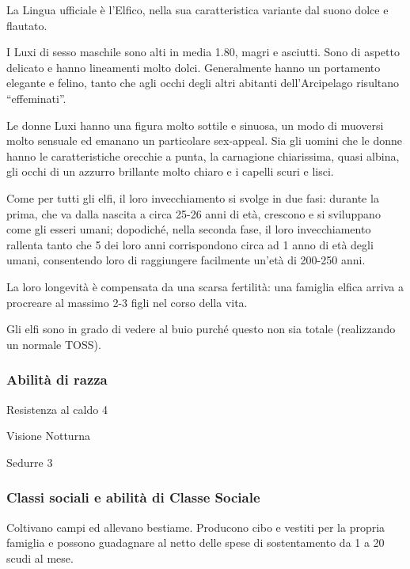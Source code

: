 La Lingua ufficiale \`e l'Elfico, nella sua caratteristica variante
dal suono dolce e flautato.


\Fisico I Luxi di sesso maschile sono alti in media 1.80, magri e
asciutti.  Sono di aspetto delicato e hanno lineamenti molto dolci.
Generalmente hanno un portamento elegante e felino, tanto che agli
occhi degli altri abitanti dell'Arcipelago risultano ``effeminati''.

Le donne Luxi hanno una figura molto sottile e sinuosa, un modo di
muoversi molto sensuale ed emanano un particolare sex-appeal. Sia
gli uomini che le donne hanno le caratteristiche orecchie a punta, la
carnagione chiarissima, quasi albina, gli occhi di un azzurro
brillante molto chiaro e i capelli scuri e lisci.

Come per tutti gli elfi, il loro invecchiamento si svolge in due fasi:
durante la prima, che va dalla nascita a circa 25-26 anni di et\`a,
crescono e si sviluppano come gli esseri umani; dopodich\'e, nella
seconda fase, il loro invecchiamento rallenta tanto che 5 dei loro
anni corrispondono circa ad 1 anno di et\`a degli umani, consentendo
loro di raggiungere facilmente un'et\`a di 200-250 anni. 

La loro longevit\`a \`e compensata da una scarsa fertilit\`a: una
famiglia elfica arriva a procreare al massimo 2-3 figli nel corso
della vita.

Gli elfi sono in grado di vedere al buio purch\'e questo non sia
totale (realizzando un normale TOSS).

\minmaxelfi

\subsubsection{Abilit\`a di razza}

\begin{abilist}
\item Resistenza al caldo 4
\item Visione Notturna
\item Sedurre 3
\end{abilist}

\subsubsection{Classi sociali e abilit\`a di Classe
  Sociale}


Coltivano campi ed allevano bestiame.  Producono cibo e vestiti per la
propria famiglia e possono guadagnare al netto delle spese di
sostentamento da 1 a 20 scudi al mese.

